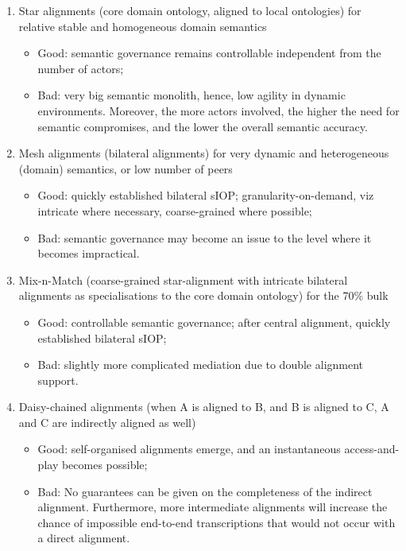 \documentclass[sort&compress,preprint,authoryear,3p,twocolumn]{elsarticle}
\providecommand{\tightlist}{%
  \setlength{\itemsep}{0pt}\setlength{\parskip}{0pt}}
\begin{document}
\begin{enumerate}
\def\labelenumi{\roman{enumi}.}
\tightlist
\item
  Star alignments (core domain ontology, aligned to local ontologies)
  for relative stable and homogeneous domain semantics

  \begin{itemize}
  \tightlist
  \item
    Good: semantic governance remains controllable independent from the
    number of actors;
  \item
    Bad: very big semantic monolith, hence, low agility in dynamic
    environments. Moreover, the more actors involved, the higher the
    need for semantic compromises, and the lower the overall semantic
    accuracy.
  \end{itemize}
\item
  Mesh alignments (bilateral alignments) for very dynamic and
  heterogeneous (domain) semantics, or low number of peers

  \begin{itemize}
  \tightlist
  \item
    Good: quickly established bilateral sIOP; granularity-on-demand, viz
    intricate where necessary, coarse-grained where possible;
  \item
    Bad: semantic governance may become an issue to the level where it
    becomes impractical.
  \end{itemize}
\item
  Mix-n-Match (coarse-grained star-alignment with intricate bilateral
  alignments as specialisations to the core domain ontology) for the
  70\% bulk

  \begin{itemize}
  \tightlist
  \item
    Good: controllable semantic governance; after central alignment,
    quickly established bilateral sIOP;
  \item
    Bad: slightly more complicated mediation due to double alignment
    support.
  \end{itemize}
\item
  Daisy-chained alignments (when A is aligned to B, and B is aligned to
  C, A and C are indirectly aligned as well)

  \begin{itemize}
  \tightlist
  \item
    Good: self-organised alignments emerge, and an instantaneous
    access-and-play becomes possible;
  \item
    Bad: No guarantees can be given on the completeness of the indirect
    alignment. Furthermore, more intermediate alignments will increase
    the chance of impossible end-to-end transcriptions that would not
    occur with a direct alignment.
  \end{itemize}
\end{enumerate}
\end{document}

